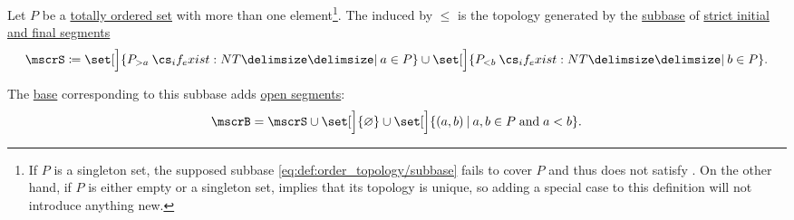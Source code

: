 \begin{definition}\label{def:order_topology}
  Let \( P \) be a \hyperref[def:partially_ordered_set]{totally ordered set} with more than one element\footnote{If \( P \) is a singleton set, the supposed subbase \eqref{eq:def:order_topology/subbase} fails to cover \( P \) and thus does not satisfy . On the other hand, if \( P \) is either empty or a singleton set,  implies that its topology is unique, so adding a special case to this definition will not introduce anything new.}. The  induced by \( \leq \) is the topology generated by the \hyperref[def:topological_subbase]{subbase} of \hyperref[def:order_interval/unbounded]{strict initial and final segments}
  \begin{equation}\label{eq:def:order_topology/subbase}
    \mscrS \coloneqq \set[\Big]{ P_{>a} \given* a \in P } \cup \set[\Big]{ P_{<b} \given* b \in P }.
  \end{equation}

  The \hyperref[def:topological_base]{base} corresponding to this subbase adds \hyperref[def:order_interval/open]{open segments}:
  \begin{equation}\label{eq:def:order_topology/base}
    \mscrB = \mscrS \cup \set[\Big]{ \varnothing } \cup \set[\Big]{ (a, b) \given a, b \in P \T{and} a < b }.
  \end{equation}
\end{definition}
